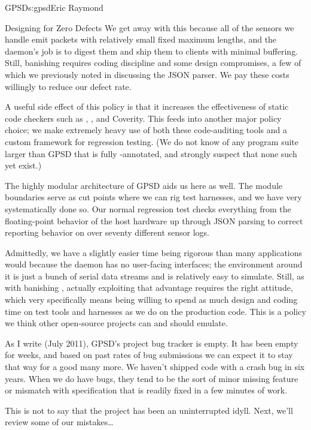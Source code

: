 \begin{aosachapter}{GPSD}{s:gpsd}{Eric Raymond}
\begin{aosasect1}{Designing for Zero Defects}
We get away with this because all of the sensors we handle emit
packets with relatively small fixed maximum lengths, and the daemon's
job is to digest them and ship them to clients with minimal buffering.
Still, banishing  requires coding discipline and some
design compromises, a few of which we previously noted in discussing
the JSON parser. We pay these costs willingly to reduce our defect
rate.

A useful side effect of this policy is that it increases the
effectiveness of static code checkers such as ,
, and Coverity.  This feeds into another major policy
choice; we make extremely heavy use of both these code-auditing tools
and a custom framework for regression testing.  (We do not know of any
program suite larger than GPSD that is fully -annotated,
and strongly suspect that none such yet exist.)

The highly modular architecture of GPSD aids us here as well. The
module boundaries serve as cut points where we can rig test harnesses,
and we have very systematically done so.  Our normal regression test
checks everything from the floating-point behavior of the host
hardware up through JSON parsing to correct reporting behavior on over
seventy different sensor logs.

Admittedly, we have a slightly easier time being rigorous than many
applications would because the daemon has no user-facing interfaces;
the environment around it is just a bunch of serial data streams and is
relatively easy to simulate.  Still, as with banishing ,
actually exploiting that advantage requires the right attitude, which
very specifically means being willing to spend as much design and
coding time on test tools and harnesses as we do on the production
code.  This is a policy we think other open-source projects can and
should emulate.

As I write (July 2011), GPSD's project bug tracker is empty.  It has
been empty for weeks, and based on past rates of bug submissions we can
expect it to stay that way for a good many more.  We haven't shipped
code with a crash bug in six years.  When we do have bugs, they tend
to be the sort of minor missing feature or mismatch with specification
that is readily fixed in a few minutes of work.

This is not to say that the project has been an uninterrupted idyll.  
Next, we'll review some of our mistakes{\ldots}

\end{aosasect1}


\end{aosachapter}

